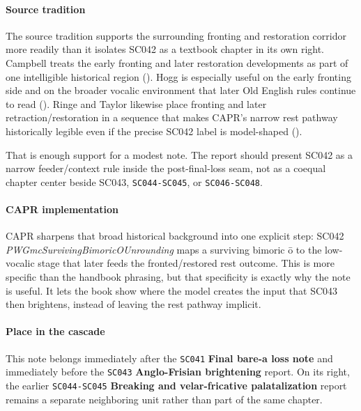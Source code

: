 \documentclass[
  british,
  a4paper,
]{article}
\begin{document}
\paragraph{Source tradition}\label{source-tradition-26}

The source tradition supports the surrounding fronting and restoration
corridor more readily than it isolates SC042 as a textbook chapter in
its own right. Campbell treats the early fronting and later restoration
developments as part of one intelligible historical region
(). Hogg
is especially useful on the early fronting side and on the broader
vocalic environment that later Old English rules continue to read
(). Ringe and Taylor
likewise place fronting and later retraction/restoration in a sequence
that makes CAPR's narrow rest pathway historically legible even if the
precise SC042 label is model-shaped
().

That is enough support for a modest note. The report should present
SC042 as a narrow feeder/context rule inside the post-final-loss seam,
not as a coequal chapter center beside SC043, \texttt{SC044-SC045}, or
\texttt{SC046-SC048}.

\paragraph{CAPR implementation}\label{capr-implementation-26}

CAPR sharpens that broad historical background into one explicit step:
SC042 \emph{PWGmcSurvivingBimoricOUnrounding} maps a surviving bimoric ō
to the low-vocalic stage that later feeds the fronted/restored rest
outcome. This is more specific than the handbook phrasing, but that
specificity is exactly why the note is useful. It lets the book show
where the model creates the input that SC043 then brightens, instead of
leaving the rest pathway implicit.

\paragraph{Place in the cascade}\label{place-in-the-cascade-26}

This note belongs immediately after the \texttt{SC041} \textbf{Final
bare-a loss note} and immediately before the \texttt{SC043}
\textbf{Anglo-Frisian brightening} report. On its right, the earlier
\texttt{SC044-SC045} \textbf{Breaking and velar-fricative
palatalization} report remains a separate neighboring unit rather than
part of the same chapter.
\end{document}
